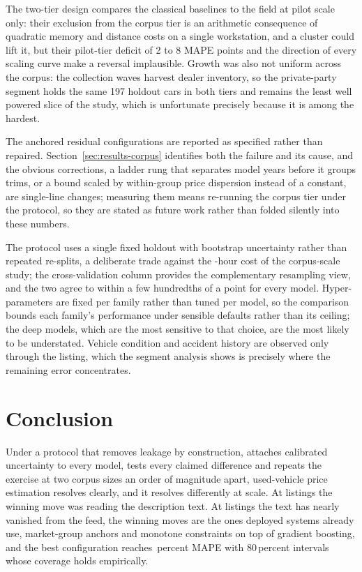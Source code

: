 \documentclass[journal,10pt]{IEEEtran}
\begin{document}
The two-tier design compares the classical baselines to the field at pilot scale only: their exclusion from the corpus tier is an arithmetic consequence of quadratic memory and distance costs on a single workstation, and a cluster could lift it, but their pilot-tier deficit of 2 to 8 MAPE points and the direction of every scaling curve make a reversal implausible. Growth was also not uniform across the corpus: the collection waves harvest dealer inventory, so the private-party segment holds the same 197 holdout cars in both tiers and remains the least well powered slice of the study, which is unfortunate precisely because it is among the hardest.

The anchored residual configurations are reported as specified rather than repaired. Section~\ref{sec:results-corpus} identifies both the failure and its cause, and the obvious corrections, a ladder rung that separates model years before it groups trims, or a bound scaled by within-group price dispersion instead of a constant, are single-line changes; measuring them means re-running the corpus tier under the protocol, so they are stated as future work rather than folded silently into these numbers.

The protocol uses a single fixed holdout with bootstrap uncertainty rather than repeated re-splits, a deliberate trade against the \StudyHours{}-hour cost of the corpus-scale study; the cross-validation column provides the complementary resampling view, and the two agree to within a few hundredths of a point for every model. Hyper-parameters are fixed per family rather than tuned per model, so the comparison bounds each family's performance under sensible defaults rather than its ceiling; the deep models, which are the most sensitive to that choice, are the most likely to be understated. Vehicle condition and accident history are observed only through the listing, which the segment analysis shows is precisely where the remaining error concentrates.

\section{Conclusion}
\label{sec:conclusion}
Under a protocol that removes leakage by construction, attaches calibrated uncertainty to every model, tests every claimed difference and repeats the exercise at two corpus sizes an order of magnitude apart, used-vehicle price estimation resolves clearly, and it resolves differently at scale. At \PilotRows{} listings the winning move was reading the description text. At \NRows{} listings the text has nearly vanished from the feed, the winning moves are the ones deployed systems already use, market-group anchors and monotone constraints on top of gradient boosting, and the best configuration reaches \ChampionMape\,percent MAPE with 80\,percent intervals whose coverage holds empirically.
\end{document}
